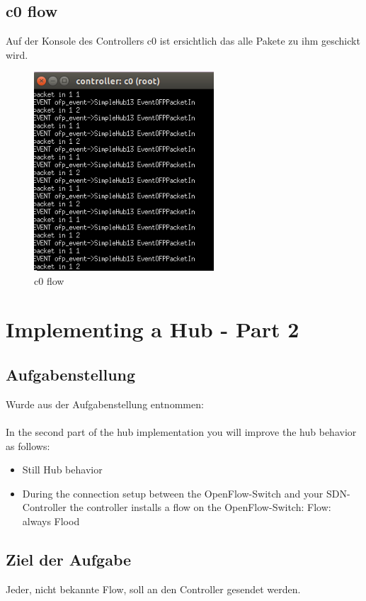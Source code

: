 \documentclass[a4,12pt]{scrartcl}
\begin{document}
\subsection{c0 flow}
Auf der Konsole des Controllers c0 ist ersichtlich das alle Pakete zu ihm geschickt wird. 
\begin{figure} [H]
	\begin{center}
	\includegraphics[width=0.60\textwidth]{./pictures/c0_ex1.png}
	\caption{c0 flow}
	\label{x}
	\end{center}
\end{figure} 
\newpage

\section{Implementing a Hub - Part 2}

\subsection{Aufgabenstellung}
Wurde aus der Aufgabenstellung entnommen: \\
\\
In the second part of the hub implementation you will improve the hub behavior as follows:
\begin{itemize}
\item Still Hub behavior
\item During the connection setup between the OpenFlow-Switch and your SDN-Controller the controller installs a flow on the OpenFlow-Switch:  Flow: always Flood
\end{itemize}

\subsection{Ziel der Aufgabe}
Jeder, nicht bekannte Flow, soll an den Controller gesendet werden. 
\end{document}
